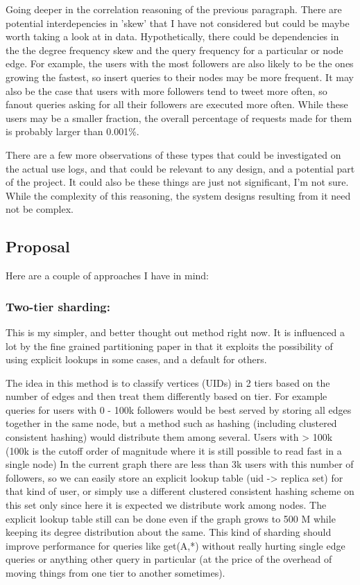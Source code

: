 \documentclass{article}
\begin{document}
Going deeper in the correlation reasoning of the previous paragraph. There are potential interdepencies in 'skew' that I have not considered but could be maybe worth taking a look at in data. Hypothetically, there could be dependencies in the the degree frequency skew and the query frequency for a particular or node edge. For example, the users with the most followers are also likely to be the ones growing the fastest, so insert queries to their nodes may be more frequent. It may also be the case that users with more followers tend to tweet more often, so fanout queries asking for all their followers are executed more often. While these users may be a smaller fraction, the overall percentage of requests made for them is probably larger than 0.001\%.  

There are a few more observations of these types that could be investigated on the actual use logs, and that could be relevant to any design, and a potential part of the project. It could also be these things are just not significant, I'm not sure. While the complexity of this reasoning, the system designs resulting from it need not be complex.

\subsection{Proposal}

Here are a couple of approaches  I have in mind:

\subsubsection{Two-tier sharding:}

This is my simpler, and better thought out method right now. It is influenced a lot by the fine grained partitioning paper in that it exploits the possibility of using explicit lookups in some cases, and a default for others.

The idea in this method is to classify vertices (UIDs) in 2 tiers based on the number of edges and then treat them differently based on tier. For example  queries for users with 0 - 100k  followers would be best served by storing all edges together in the same node, but a method such as hashing (including clustered consistent hashing) would distribute them among several.  Users with > 100k (100k is the cutoff order of magnitude where it is still possible to read fast in a single node) In the current graph there are less than 3k users with this number of followers,  so we can easily store an explicit lookup table (uid -> replica set) for that kind of user, or simply use a different clustered consistent hashing scheme on this set only since here it is expected we distribute work among nodes.  The explicit lookup table still can be done even if the graph grows to 500 M while keeping its degree distribution about the same.  This kind of sharding should improve performance for queries like get(A,*) without really hurting single edge queries or anything other query in particular (at the price of  the overhead of moving things from one tier to another sometimes).
\end{document}
